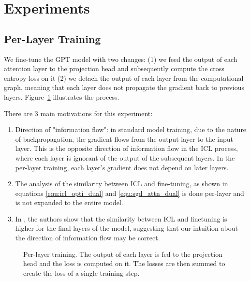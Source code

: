 \documentclass[11pt]{article}
\begin{document}
\section{Experiments}
\subsection{Per-Layer Training}
We fine-tune the GPT model with two changes: (1) we feed the output of each attention layer to the projection head and subsequently compute the cross entropy loss on it
(2) we detach the output of each layer from the computational graph, meaning that each layer does not propagate the gradient back to previous layers. Figure~\ref{per-layer-training} illustrates the process.

There are 3 main motivations for this experiment:
\begin{enumerate}
	\item Direction of "information flow": in standard model training, due to the nature of backpropagation, the gradient flows from the output layer to the input layer.
	      This is the opposite direction of information flow in the ICL process, where each layer is ignorant of the output of the subsequent layers.
	      In the per-layer training, each layer's gradient does not depend on later layers.
	\item The analysis of the similarity between ICL and fine-tuning, as shown in equations \ref{equ:icl_opti_dual} and \ref{equ:sgd_attn_dual} is done per-layer and is not expanded to the entire model.
	\item In \cite{dai2023gpt}, the authors show that the similarity between ICL and finetuning is higher for the final layers of the model, suggesting that our intuition about the direction of information flow may be correct.
\end{enumerate}

\begin{figure}%
	\centering
	\caption{Per-layer training. The output of each layer is fed to the projection head and the loss is computed on it. The losses are then summed to create the loss of a single training step.}
	\label{per-layer-training}
\end{figure}
\end{document}
